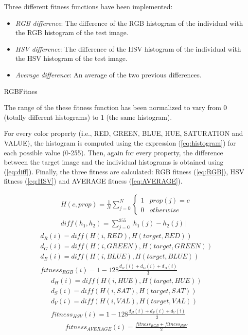 
Three different fitness functions have been implemented:
\begin{itemize}
\item {\em RGB difference}: The difference of the RGB histogram of the individual with the RGB histogram of the test image.
\item {\em HSV difference}: The difference of the HSV histogram of the individual with the HSV histogram of the test image.
\item {\em Average difference}: An average of the two previous differences.
\end{itemize}

RGBFitnes

The range of the these fitness function has been normalized to vary from 0 (totally different histograms) to 1 (the same histogram).

For every color property (i.e., RED, GREEN, BLUE, HUE, SATURATION and VALUE), the histogram is computed using the expression (\ref{eq:histogram}) for each possible value (0-255). Then, again for every property, the difference between the target image and the individual histograms is obtained using (\ref{eq:diff}). Finally, the three fitness are calculated: RGB fitness (\ref{eq:RGB}), HSV fitness (\ref{eq:HSV}) and AVERAGE fitness (\ref{eq:AVERAGE}).

\begin{eqnarray}
  \label{eq:histogram}
  H(c, prop) = \frac{1}{N}\sum_{j=0}^N \left\{\begin{matrix}
1 & prop(j) = c\\ 
0 & otherwise
\end{matrix}\right. \\
\label{eq:diff}
diff(h_1, h_2) = \sum_{j=0}^{255} |h_1(j) - h_2(j)|
\end{eqnarray}
\begin{eqnarray}
  d_R(i) = diff(H(i, RED), H(target, RED))\\
  d_G(i) = diff(H(i, GREEN), H(target, GREEN))\\
  d_B(i) =  diff(H(i, BLUE), H(target, BLUE))\\
  \label{eq:RGB}
  fitness_{RGB}(i) = 1 - 128\frac{d_R(i) + d_G(i) + d_B(i)}{3}
\end{eqnarray}
\begin{eqnarray}
  d_H(i) = diff(H(i, HUE), H(target, HUE))\\
  d_S(i) = diff(H(i, SAT), H(target, SAT))\\
  d_V(i) =  diff(H(i, VAL), H(target, VAL))\\
  \label{eq:HSV}
  fitness_{HSV}(i) = 1 - 128\frac{d_H(i) + d_S(i) + d_V(i)}{3}
\end{eqnarray}
\begin{eqnarray}
  \label{eq:AVERAGE}
  fitness_{AVERAGE}(i) = \frac{fitness_{RGB}+fitness_{HSV}}{2}
\end{eqnarray}




